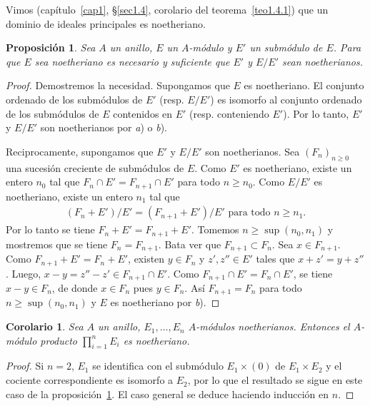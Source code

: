 \documentclass[10pt,oneside,bibtotoc,smallheadings,leqno,a5paper,DIV=12]{scrbook}
\numberwithin{equation}{section}
\theoremstyle{defi}
\theoremstyle{enonce}
\newtheorem{proposition}{Proposici\'on}
\newtheorem{corollary}{Corolario}
\theoremstyle{rem}
\numberwithin{theorem}{section}
\numberwithin{proposition}{section}
\numberwithin{definition}{section}
\numberwithin{lemma}{section}
\numberwithin{corollary}{section}
\numberwithin{example}{section}
\numberwithin{footnote}{section}%
\begin{document}
Vimos (cap\'itulo~\ref{cap1}, \S\ref{sec1.4}, corolario del teorema~\ref{teo1.4.1}) que un
dominio de ideales principales es noetheriano.

\begin{proposition}\label{prop3.1.1}
Sea $A$ un anillo, $E$ un $A$-m\'odulo y $E'$ un subm\'odulo de $E$. Para que $E$ sea
noetheriano es necesario y suficiente que $E'$ y $E/E'$ sean noetherianos.
\end{proposition}

\begin{proof}
Demostremos la necesidad. Supongamos que $E$ es noetheriano. El conjunto ordenado de los
subm\'odulos de $E'$ (resp. $E/E'$) es isomorfo al conjunto ordenado de los subm\'odulos de $E$
contenidos en $E'$ (resp. conteniendo $E'$). Por lo tanto, $E'$ y $E/E'$ son noetherianos por {\itshape a})
o {\itshape b}).

Reciprocamente, supongamos que $E'$ y $E/E'$ son noetherianos. Sea $(F_{n})_{n\geq 0}$ una
sucesi\'on creciente de subm\'odulos de $E$. Como $E'$ es noetheriano, existe un entero
$n_{0}$ tal que $F_{n}\cap E' = F_{n+1}\cap E'$ para todo $n\geq n_{0}$. Como $E/E'$ es noetheriano,
existe un entero $n_{1}$ tal que
\begin{gather*}
(F_{n}+E')/E' = (F_{n+1}+E')/E'\text{ para todo }n\geq n_{1}.
\end{gather*}
Por lo tanto se tiene $F_{n}+E'=  F_{n+1}+E'$. Tomemos $n\geq\sup(n_{0},n_{1})$ y mostremos
que se tiene $F_{n} = F_{n+1}$. Bata ver que $F_{n+1}\subset F_{n}$. Sea $x\in F_{n+1}$.
Como $F_{n+1}+E' = F_{n}+E'$, existen $y\in F_{n}$ y $z',z''\in E'$ tales que
$x+z' = y+z''$. Luego, $x-y = z''-z'\in F_{n+1}\cap E'$. Como $F_{n+1}\cap E' = F_{n}\cap E'$,
se tiene $x-y\in F_{n}$, de donde $x\in F_{n}$ pues $y\in F_{n}$. As\'i $F_{n+1} = F_{n}$ para
todo $n\geq \sup(n_{0},n_{1})$ y $E$ es noetheriano por {\itshape b}).
\end{proof}

\begin{corollary}\label{cor3.1.1}
Sea $A$ un anillo, $E_{1},\dots,E_{n}$ $A$-m\'odulos noetherianos. Entonces el $A$-m\'odulo
producto $\prod_{i=1}^{n}E_{i}$ es noetheriano.
\end{corollary}

\begin{proof}
Si $n=2$, $E_{1}$ se identifica con el subm\'odulo $E_{1}\times(0)$ de $E_{1}\times E_{2}$ y el
cociente correspondiente es isomorfo a $E_{2}$, por lo que el resultado se sigue en este caso
de la proposici\'on~\ref{prop3.1.1}. El caso general se deduce haciendo inducci\'on en $n$.
\end{proof}
\end{document}
